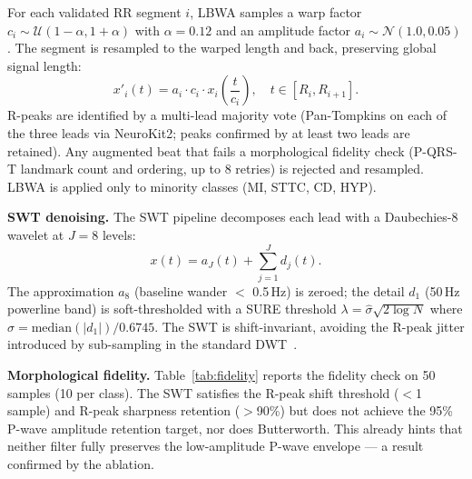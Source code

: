 \documentclass{article}
\begin{document}
For each validated RR segment $i$, LBWA samples a warp factor
$c_i \sim \mathcal{U}(1-\alpha, 1+\alpha)$ with $\alpha{=}0.12$
and an amplitude factor $a_i \sim \mathcal{N}(1.0, 0.05)$. The
segment is resampled to the warped length and back, preserving global
signal length:
\begin{equation}
x'_i(t) = a_i \cdot c_i \cdot x_i\!\left(\frac{t}{c_i}\right),
\quad t \in [R_i, R_{i+1}].
\label{eq:lbwa}
\end{equation}
R-peaks are identified by a multi-lead majority vote (Pan-Tompkins
on each of the three leads via NeuroKit2; peaks confirmed by at least
two leads are retained). Any augmented beat that fails a morphological
fidelity check (P-QRS-T landmark count and ordering, up to 8 retries)
is rejected and resampled. LBWA is applied only to minority classes
(MI, STTC, CD, HYP).

\textbf{SWT denoising.}
The SWT pipeline decomposes each lead with a Daubechies-8 wavelet
at $J{=}8$ levels:
\begin{equation}
x(t) = a_J(t) + \sum_{j=1}^{J} d_j(t).
\label{eq:swt}
\end{equation}
The approximation $a_8$ (baseline wander $<$ 0.5\,Hz) is zeroed;
the detail $d_1$ (50\,Hz powerline band) is soft-thresholded with
a SURE threshold $\lambda = \hat{\sigma}\sqrt{2 \log N}$ where
$\hat{\sigma} = \mathrm{median}(|d_1|)/0.6745$. The SWT is
shift-invariant, avoiding the R-peak jitter introduced by
sub-sampling in the standard DWT~\cite{addison2005}.

\textbf{Morphological fidelity.}
Table~\ref{tab:fidelity} reports the fidelity check on 50 samples
(10 per class). The SWT satisfies the R-peak shift threshold
($<$1 sample) and R-peak sharpness retention ($>$90\%) but does not
achieve the 95\% P-wave amplitude retention target, nor does
Butterworth. This already hints that neither filter fully preserves
the low-amplitude P-wave envelope --- a result confirmed by the
ablation.
\end{document}
